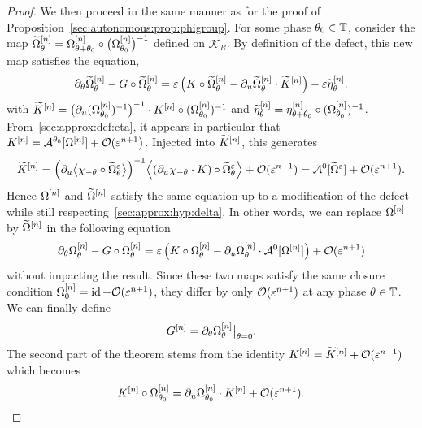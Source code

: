 \begin{proof}
We then proceed in the same manner as for the proof of
Proposition~\ref{sec:autonomous:prop:phigroup}. For some phase $\theta_0
\in \mathbb{T}$, consider the map $\widetilde{\Omega}^{[n]} _\theta = \Omega^{[n]}
_{\theta + \theta_0} \circ \big( \Omega^{[n]} _{\theta_0} \big) ^{-1}$
defined on $\mathcal{K}_R$. By definition of the defect, this new map
satisfies the equation, 
\begin{equation*} 
  \partial_\theta \widetilde\Omega^{[n]} _{\theta}
  - G \circ \widetilde \Omega^{[n]} _{\theta}
  = \varepsilon\left( K \circ \widetilde \Omega^{[n]} _{\theta}
    - \partial_u \widetilde \Omega^{[n]} _{\theta} \cdot 
    \widetilde{K}^{[n]}
  \right) 
  - \varepsilon \widetilde{\eta}^{[n]} _\theta  .
\end{equation*}
with $\widetilde{K}^{[n]} = \big(\partial_u (\Omega^{[n]} _{\theta_0})^{-1}
\big)^{-1} \cdot K^{[n]}  \circ (\Omega^{[n]} _{\theta_0})^{-1}$ and $
\widetilde{\eta}^{[n]} _\theta = \eta^{[n]} _{\theta + \theta_0} \circ
(\Omega^{[n]} _{\theta_0} ) ^{-1}$. From~\eqref{sec:approx:def:eta}, it
appears in particular that $K^{[n]} = \mathcal{A}^{\theta_0}[\Omega^{[n]}] +
\mathcal{O}(\varepsilon^{n+1} \big)$. Injected into $\widetilde{K}^{[n]}$, this
generates 
\begin{equation*}
  \widetilde{K}^{[n]} = 
  \Big( \partial_u \big \langle \chi_{-\theta} 
    \circ \widetilde\Omega^{\varepsilon} _\theta \big \rangle \Big) ^{-1}
  \Big \langle (\partial_u \chi_{-\theta} \cdot K) 
    \circ \widetilde\Omega^{\varepsilon} _\theta \Big \rangle + \mathcal{O}( \varepsilon^{n+1} ) 
  = \mathcal{A}^{0}[\widetilde{\Omega}^{\varepsilon}] + \mathcal{O}( \varepsilon^{n+1} ) . 
\end{equation*}
Hence $\Omega^{[n]}$ and $\widetilde{\Omega}^{[n]}$ satisfy the same
equation up to a modification of the defect while still
respecting~\eqref{sec:approx:hyp:delta}. In other words, we can replace
$\Omega^{[n]}$ by $\widetilde{\Omega}^{[n]}$ in the following equation 
\begin{equation*}
  \partial_\theta \Omega^{[n]} _{\theta}
  - G \circ  \Omega^{[n]} _{\theta}
  = \varepsilon\left( K \circ  \Omega^{[n]} _{\theta}
    - \partial_u  \Omega^{[n]} _{\theta} \cdot 
    \mathcal{A}^0[\Omega^{[n]}]
  \right) + \mathcal{O}( \varepsilon^{n+1}) 
\end{equation*}
without impacting the result. Since these two maps satisfy the same
closure condition $\Omega^{[n]} _0 = \operatorname{id} + \mathcal{O}( \varepsilon^{n+1} )$, they
differ by only $\mathcal{O}( \varepsilon^{n+1})$ at any phase $\theta \in \mathbb{T}$. We can
finally define 
\begin{equation*}
  G^{[n]} = \partial_\theta \Omega^{[n]} _\theta \big|_{\theta = 0} .
\end{equation*}
The second part of the theorem stems from the identity $K^{[n]} =
\widetilde{K}^{[n]} + \mathcal{O}( \varepsilon^{n+1} )$ which becomes 
\begin{equation*}
  K^{[n]} \circ \Omega^{[n]} _{\theta_0} 
  = \partial_u \Omega^{[n]} _{\theta_0} \cdot K^{[n]} + \mathcal{O} ( \varepsilon^{n+1} ) . 
\end{equation*}
\end{proof}

